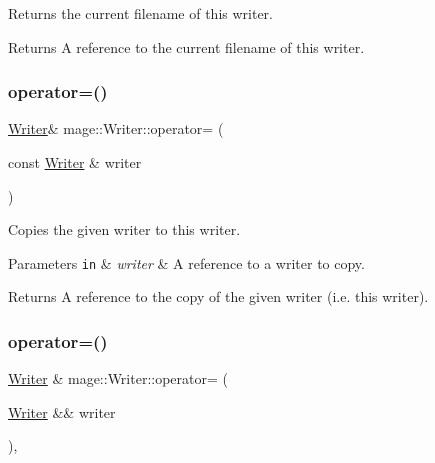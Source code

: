 Returns the current filename of this writer.

\begin{DoxyReturn}{Returns}
A reference to the current filename of this writer. 
\end{DoxyReturn}
\mbox{\label{classmage_1_1_writer_a81ea888d1b170515713432ca28629ceb}} 
\subsubsection{\texorpdfstring{operator=()}{operator=()}\hspace{0.1cm}{\footnotesize\ttfamily [1/2]}}
{\footnotesize\ttfamily \mbox{\hyperlink{classmage_1_1_writer}{Writer}}\& mage\+::\+Writer\+::operator= (\begin{DoxyParamCaption}\item[{const \mbox{\hyperlink{classmage_1_1_writer}{Writer}} \&}]{writer }\end{DoxyParamCaption})\hspace{0.3cm}{\ttfamily [delete]}}

Copies the given writer to this writer.


\begin{DoxyParams}[1]{Parameters}
\mbox{\tt in}  & {\em writer} & A reference to a writer to copy. \\
\hline
\end{DoxyParams}
\begin{DoxyReturn}{Returns}
A reference to the copy of the given writer (i.\+e. this writer). 
\end{DoxyReturn}
\mbox{\label{classmage_1_1_writer_a03a93796179f22be90471bea0f7a7cf0}} 
\subsubsection{\texorpdfstring{operator=()}{operator=()}\hspace{0.1cm}{\footnotesize\ttfamily [2/2]}}
{\footnotesize\ttfamily \mbox{\hyperlink{classmage_1_1_writer}{Writer}} \& mage\+::\+Writer\+::operator= (\begin{DoxyParamCaption}\item[{\mbox{\hyperlink{classmage_1_1_writer}{Writer}} \&\&}]{writer }\end{DoxyParamCaption})\hspace{0.3cm}{\ttfamily [default]}, {\ttfamily [noexcept]}}

